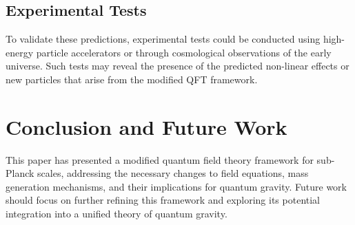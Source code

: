 \documentclass{article}
\begin{document}
\subsection{Experimental Tests}
To validate these predictions, experimental tests could be conducted using high-energy particle accelerators or through cosmological observations of the early universe. Such tests may reveal the presence of the predicted non-linear effects or new particles that arise from the modified QFT framework.

\section{Conclusion and Future Work}
This paper has presented a modified quantum field theory framework for sub-Planck scales, addressing the necessary changes to field equations, mass generation mechanisms, and their implications for quantum gravity. Future work should focus on further refining this framework and exploring its potential integration into a unified theory of quantum gravity.
\end{document}
